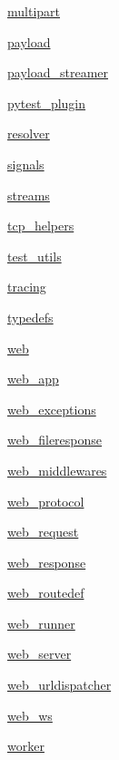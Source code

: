 \begin{DoxyCompactItemize}
\item 
 \hyperlink{namespaceaiohttp_1_1multipart}{multipart}
\item 
 \hyperlink{namespaceaiohttp_1_1payload}{payload}
\item 
 \hyperlink{namespaceaiohttp_1_1payload__streamer}{payload\+\_\+streamer}
\item 
 \hyperlink{namespaceaiohttp_1_1pytest__plugin}{pytest\+\_\+plugin}
\item 
 \hyperlink{namespaceaiohttp_1_1resolver}{resolver}
\item 
 \hyperlink{namespaceaiohttp_1_1signals}{signals}
\item 
 \hyperlink{namespaceaiohttp_1_1streams}{streams}
\item 
 \hyperlink{namespaceaiohttp_1_1tcp__helpers}{tcp\+\_\+helpers}
\item 
 \hyperlink{namespaceaiohttp_1_1test__utils}{test\+\_\+utils}
\item 
 \hyperlink{namespaceaiohttp_1_1tracing}{tracing}
\item 
 \hyperlink{namespaceaiohttp_1_1typedefs}{typedefs}
\item 
 \hyperlink{namespaceaiohttp_1_1web}{web}
\item 
 \hyperlink{namespaceaiohttp_1_1web__app}{web\+\_\+app}
\item 
 \hyperlink{namespaceaiohttp_1_1web__exceptions}{web\+\_\+exceptions}
\item 
 \hyperlink{namespaceaiohttp_1_1web__fileresponse}{web\+\_\+fileresponse}
\item 
 \hyperlink{namespaceaiohttp_1_1web__middlewares}{web\+\_\+middlewares}
\item 
 \hyperlink{namespaceaiohttp_1_1web__protocol}{web\+\_\+protocol}
\item 
 \hyperlink{namespaceaiohttp_1_1web__request}{web\+\_\+request}
\item 
 \hyperlink{namespaceaiohttp_1_1web__response}{web\+\_\+response}
\item 
 \hyperlink{namespaceaiohttp_1_1web__routedef}{web\+\_\+routedef}
\item 
 \hyperlink{namespaceaiohttp_1_1web__runner}{web\+\_\+runner}
\item 
 \hyperlink{namespaceaiohttp_1_1web__server}{web\+\_\+server}
\item 
 \hyperlink{namespaceaiohttp_1_1web__urldispatcher}{web\+\_\+urldispatcher}
\item 
 \hyperlink{namespaceaiohttp_1_1web__ws}{web\+\_\+ws}
\item 
 \hyperlink{namespaceaiohttp_1_1worker}{worker}
\end{DoxyCompactItemize}
